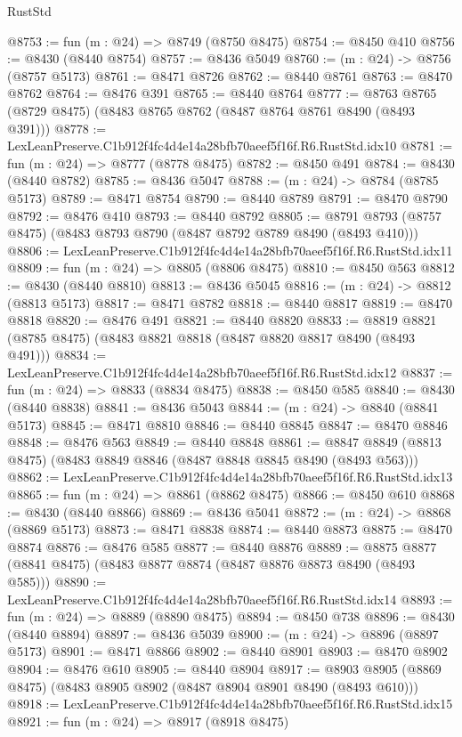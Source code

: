 \begin{lexlean}{RustStd}
\begin{coremodule}
@8753 := fun (m : @24) => @8749 (@8750 @8475)
@8754 := @8450 @410
@8756 := @8430 (@8440 @8754)
@8757 := @8436 @5049
@8760 := (m : @24) -> @8756 (@8757 @5173)
@8761 := @8471 @8726
@8762 := @8440 @8761
@8763 := @8470 @8762
@8764 := @8476 @391
@8765 := @8440 @8764
@8777 := @8763 @8765 (@8729 @8475) (@8483 @8765 @8762 (@8487 @8764 @8761 @8490 (@8493 @391)))
@8778 := LexLeanPreserve.C1b912f4fc4d4e14a28bfb70aeef5f16f.R6.RustStd.idx10
@8781 := fun (m : @24) => @8777 (@8778 @8475)
@8782 := @8450 @491
@8784 := @8430 (@8440 @8782)
@8785 := @8436 @5047
@8788 := (m : @24) -> @8784 (@8785 @5173)
@8789 := @8471 @8754
@8790 := @8440 @8789
@8791 := @8470 @8790
@8792 := @8476 @410
@8793 := @8440 @8792
@8805 := @8791 @8793 (@8757 @8475) (@8483 @8793 @8790 (@8487 @8792 @8789 @8490 (@8493 @410)))
@8806 := LexLeanPreserve.C1b912f4fc4d4e14a28bfb70aeef5f16f.R6.RustStd.idx11
@8809 := fun (m : @24) => @8805 (@8806 @8475)
@8810 := @8450 @563
@8812 := @8430 (@8440 @8810)
@8813 := @8436 @5045
@8816 := (m : @24) -> @8812 (@8813 @5173)
@8817 := @8471 @8782
@8818 := @8440 @8817
@8819 := @8470 @8818
@8820 := @8476 @491
@8821 := @8440 @8820
@8833 := @8819 @8821 (@8785 @8475) (@8483 @8821 @8818 (@8487 @8820 @8817 @8490 (@8493 @491)))
@8834 := LexLeanPreserve.C1b912f4fc4d4e14a28bfb70aeef5f16f.R6.RustStd.idx12
@8837 := fun (m : @24) => @8833 (@8834 @8475)
@8838 := @8450 @585
@8840 := @8430 (@8440 @8838)
@8841 := @8436 @5043
@8844 := (m : @24) -> @8840 (@8841 @5173)
@8845 := @8471 @8810
@8846 := @8440 @8845
@8847 := @8470 @8846
@8848 := @8476 @563
@8849 := @8440 @8848
@8861 := @8847 @8849 (@8813 @8475) (@8483 @8849 @8846 (@8487 @8848 @8845 @8490 (@8493 @563)))
@8862 := LexLeanPreserve.C1b912f4fc4d4e14a28bfb70aeef5f16f.R6.RustStd.idx13
@8865 := fun (m : @24) => @8861 (@8862 @8475)
@8866 := @8450 @610
@8868 := @8430 (@8440 @8866)
@8869 := @8436 @5041
@8872 := (m : @24) -> @8868 (@8869 @5173)
@8873 := @8471 @8838
@8874 := @8440 @8873
@8875 := @8470 @8874
@8876 := @8476 @585
@8877 := @8440 @8876
@8889 := @8875 @8877 (@8841 @8475) (@8483 @8877 @8874 (@8487 @8876 @8873 @8490 (@8493 @585)))
@8890 := LexLeanPreserve.C1b912f4fc4d4e14a28bfb70aeef5f16f.R6.RustStd.idx14
@8893 := fun (m : @24) => @8889 (@8890 @8475)
@8894 := @8450 @738
@8896 := @8430 (@8440 @8894)
@8897 := @8436 @5039
@8900 := (m : @24) -> @8896 (@8897 @5173)
@8901 := @8471 @8866
@8902 := @8440 @8901
@8903 := @8470 @8902
@8904 := @8476 @610
@8905 := @8440 @8904
@8917 := @8903 @8905 (@8869 @8475) (@8483 @8905 @8902 (@8487 @8904 @8901 @8490 (@8493 @610)))
@8918 := LexLeanPreserve.C1b912f4fc4d4e14a28bfb70aeef5f16f.R6.RustStd.idx15
@8921 := fun (m : @24) => @8917 (@8918 @8475)

\end{coremodule}
\end{lexlean}
